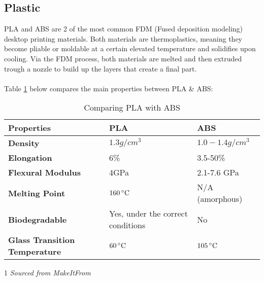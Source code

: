 \documentclass[11pt, a4paper]{article}
\begin{document}
\subsection{Plastic}
PLA and ABS are 2 of the most common FDM (Fused deposition modeling) desktop printing materials.
Both materials are thermoplastics, meaning they become pliable or moldable at a certain elevated temperature and solidifies upon cooling.
Via the FDM process, both materials are melted and then extruded trough a nozzle to build up the layers that create a final part.
\\ \\
Table \ref{tab:pla-abs} below compares the main properties between PLA \& ABS:
\begin{table}[ht]
    \centering
    \begin{threeparttable}
        \begin{tabular}[t]{>{\bfseries}l l l}
            \toprule
            Properties\tnote{1} & \textbf{PLA} & \textbf{ABS} \\
            \midrule
            Density & $1.3 g/cm^3$ & $1.0 - 1.4 g/cm^3$ \\
            Elongation & 6\% & 3.5-50\% \\ %
            Flexural Modulus & 4GPa & 2.1-7.6 GPa \\ %
            Melting Point & $160\,^{\circ}{\rm C}$ & N/A (amorphous) \\
            Biodegradable & Yes, under the correct conditions & No \\
            Glass Transition Temperature & $60\,^{\circ}{\rm C}$ & $105\,^{\circ}{\rm C}$ \\ %
            \bottomrule
        \end{tabular}
        \caption{Comparing PLA with ABS}
        \label{tab:pla-abs}
        \begin{tablenotes}
            \item[1] \textit{Sourced from MakeItFrom \cite{MakeItFrom}}
        \end{tablenotes}    
    \end{threeparttable}    
\end{table}
\end{document}
